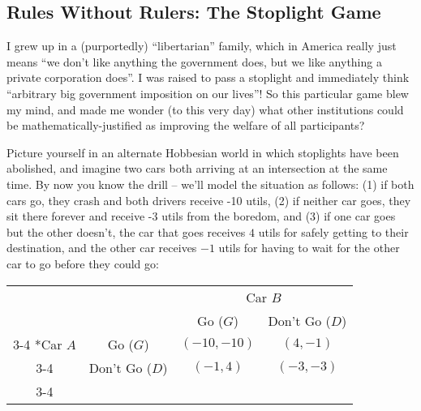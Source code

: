 \subsection{Rules Without Rulers: The Stoplight Game}


I grew up in a (purportedly) ``libertarian'' family, which in America really just means ``we don't like anything the government does, but we like anything a private corporation does''. I was raised to pass a stoplight and immediately think ``arbitrary big government imposition on our lives''! So this particular game blew my mind, and made me wonder (to this very day) what other institutions could be mathematically-justified as improving the welfare of all participants?

Picture yourself in an alternate Hobbesian world in which stoplights have been abolished, and imagine two cars both arriving at an intersection at the same time. By now you know the drill -- we'll model the situation as follows: (1) if both cars go, they crash and both drivers receive -10 utils, (2) if neither car goes, they sit there forever and receive -3 utils from the boredom, and (3) if one car goes but the other doesn't, the car that goes receives $4$ utils for safely getting to their destination, and the other car receives $-1$ utils for having to wait for the other car to go before they could go:
\begin{table}[ht!]
    \centering
    \setlength{\extrarowheight}{2pt}
    \begin{tabular}{cc|c|c|}
      & \multicolumn{1}{c}{} & \multicolumn{2}{c}{Car $B$}\\
      & \multicolumn{1}{c}{} & \multicolumn{1}{c}{Go ($G$)}  & \multicolumn{1}{c}{Don't Go ($D$)} \\\cline{3-4}
      \multirow{2}*{Car $A$}  & Go ($G$) & $(-10,-10)$ & $(4,-1)$ \\\cline{3-4}
      & Don't Go ($D$) & $(-1,4)$ & $(-3,-3)$ \\\cline{3-4}
    \end{tabular}
\label{fig:stoplight}
\end{table}

